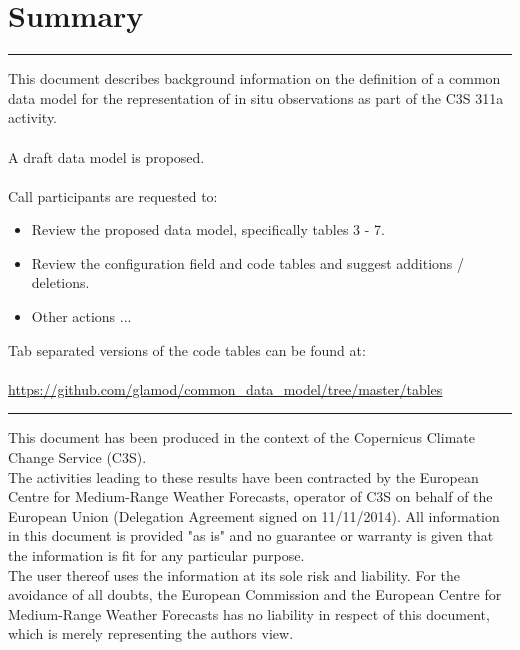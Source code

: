 \documentclass[a4paper]{article}
\newcounter{FramedDepth}
\newenvironment{Framed}{%
  \addtocounter{FramedDepth}{1}
  \ifcase\theFramedDepth\def\FrameColour{white!50}%
    \or\def\FrameColour{white!50}%
    \or\def\FrameColour{white!50}%
    \or\def\FrameColour{white!50}%
    \fi%
  \begin{mdframed}[style=Framed,backgroundcolor=\FrameColour]%
}{\end{mdframed}\addtocounter{FramedDepth}{-1}}
\begin{document}
\maketitle

\vskip 0.25in
\section*{Summary}
\hrule
\vskip 0.25in
This document describes background information on the definition of a common data model for the representation of in situ observations as part of the C3S 311a activity.\\ \\
A draft data model is proposed.\\ \\
Call participants are requested to:\\
\begin{itemize}
\item Review the proposed data model, specifically tables 3 - 7.
\item Review the configuration field and code tables and suggest additions / deletions.
\item Other actions ...
\end{itemize}
\vskip 0.25in
Tab separated versions of the code tables can be found at:\\ \\
\tabto{2cm} \url{https://github.com/glamod/common_data_model/tree/master/tables}
\vskip 0.25in
\hrule

\newpage
\vspace*{\fill}
\begin{Framed}
This document has been produced in the context of the Copernicus Climate Change Service (C3S).\\
The activities leading to these results have been contracted by the European Centre for Medium-Range Weather Forecasts, operator of C3S on behalf of the European Union (Delegation Agreement signed on 11/11/2014). All information in this document is provided "as is" and no guarantee or warranty is given that the information is fit for any particular purpose.\\
The user thereof uses the information at its sole risk and liability. For the avoidance of all doubts, the European Commission
and the European Centre for Medium-Range Weather Forecasts has no liability in respect of this document, which is merely representing the authors view.
\end{Framed}
\end{document}
